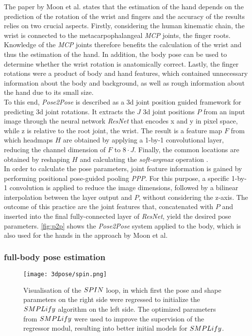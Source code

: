 The paper by Moon et al. \cite{moon} states that the estimation of the hand depends on the prediction of the rotation of the wrist and fingers and the accuracy of the results relies on two crucial aspects. Firstly, considering the human kinematic chain, the wrist is connected to the metacarpophalangeal \emph{MCP} joints, the finger roots. Knowledge of the \emph{MCP} joints therefore benefits the calculation of the wrist and thus the estimation of the hand. In addition, the body pose can be used to determine whether the wrist rotation is anatomically correct. Lastly, the finger rotations were a product of body and hand features, which contained unnecessary information about the body and background, as well as rough information about the hand due to its small size. \\
To this end, \emph{Pose2Pose} is described as a 3d joint position guided framework for predicting 3d joint rotations. It extracts the $J$ 3d joint positions $P$ from an input image through the neural network \emph{ResNet} that encodes x and y in pixel space, while z is relative to the root joint, the wrist. The result is a feature map $F$ from which headmaps $H$ are obtained by applying a 1-by-1 convolutional layer, reducing the channel dimension of $F$ to $8 \cdot J$. Finally, the common locations are obtained by reshaping $H$ and calculating the \emph{soft-argmax} operation \cite{softmax}.\\
In order to calculate the pose parameters, joint feature information is gained by performing positional pose-guided pooling \emph{PPP}. For this purpose, a specific 1-by-1 convolution is applied to reduce the image dimensions, followed by a bilinear interpolation between the layer output and $P$, without considering the z-axis. The outcome of this practice are the joint features that, concatenated with $P$ and inserted into the final fully-connected layer of \emph{ResNet}, yield the desired pose parameters. \autoref{fig:p2p} shows the \emph{Pose2Pose} system applied to the body, which is also used for the hands in the approach by Moon et al.




\subsubsection{full-body pose estimation}
\begin{figure}[h]
	\centering
	\texttt{[image: 3dpose/spin.png]}
	\caption{Visualisation of the $\protect SPIN$ loop, in which first the pose and shape parameters on the right side were regressed to initialize the $\protect SMPLify$ algorithm on the left side. The optimized parameters from $\protect SMPLify$ were used to improve the supervision of the regressor modul, resulting into better initial models for $\protect SMPLify$. \cite{spin}}
	\label{fig:spin}
\end{figure}

